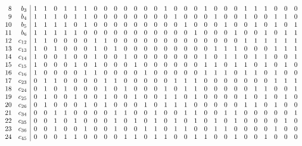 \documentclass{article}
\begin{document}
{{$$\begin{array}{rr|*{27}r}
8 & b_{3} & 1 & 1 & 0 & 1 & 1 & 1 & 0 & 0 & 0 & 0 & 0 & 0 & 0 & 1 & 0 & 0 & 0 & 1 & 0 & 0 & 0 & 1 & 1 & 1 & 0 & 0 & 0\\
9 & b_{4} & 1 & 1 & 1 & 0 & 1 & 1 & 0 & 0 & 0 & 0 & 0 & 0 & 0 & 0 & 1 & 0 & 0 & 0 & 1 & 0 & 0 & 1 & 0 & 0 & 1 & 1 & 0\\
10 & b_{5} & 1 & 1 & 1 & 1 & 0 & 1 & 0 & 0 & 0 & 0 & 0 & 0 & 0 & 0 & 0 & 1 & 0 & 0 & 0 & 1 & 0 & 0 & 1 & 0 & 1 & 0 & 1\\
11 & b_{6} & 1 & 1 & 1 & 1 & 1 & 0 & 0 & 0 & 0 & 0 & 0 & 0 & 0 & 0 & 0 & 0 & 1 & 0 & 0 & 0 & 1 & 0 & 0 & 1 & 0 & 1 & 1\\
12 & c_{12} & 1 & 1 & 0 & 0 & 0 & 0 & 1 & 1 & 0 & 0 & 0 & 0 & 0 & 0 & 0 & 0 & 0 & 0 & 0 & 0 & 0 & 1 & 1 & 1 & 1 & 1 & 1\\
13 & c_{13} & 1 & 0 & 1 & 0 & 0 & 0 & 1 & 0 & 1 & 0 & 0 & 0 & 0 & 0 & 0 & 0 & 0 & 0 & 1 & 1 & 1 & 0 & 0 & 0 & 1 & 1 & 1\\
14 & c_{14} & 1 & 0 & 0 & 1 & 0 & 0 & 1 & 0 & 0 & 1 & 0 & 0 & 0 & 0 & 0 & 0 & 0 & 1 & 0 & 1 & 1 & 0 & 1 & 1 & 0 & 0 & 1\\
15 & c_{15} & 1 & 0 & 0 & 0 & 1 & 0 & 1 & 0 & 0 & 0 & 1 & 0 & 0 & 0 & 0 & 0 & 0 & 1 & 1 & 0 & 1 & 1 & 0 & 1 & 0 & 1 & 0\\
16 & c_{16} & 1 & 0 & 0 & 0 & 0 & 1 & 1 & 0 & 0 & 0 & 0 & 1 & 0 & 0 & 0 & 0 & 0 & 1 & 1 & 1 & 0 & 1 & 1 & 0 & 1 & 0 & 0\\
17 & c_{23} & 0 & 1 & 1 & 0 & 0 & 0 & 0 & 1 & 1 & 0 & 0 & 0 & 0 & 0 & 1 & 1 & 1 & 0 & 0 & 0 & 0 & 0 & 0 & 0 & 1 & 1 & 1\\
18 & c_{24} & 0 & 1 & 0 & 1 & 0 & 0 & 0 & 1 & 0 & 1 & 0 & 0 & 0 & 1 & 0 & 1 & 1 & 0 & 0 & 0 & 0 & 0 & 1 & 1 & 0 & 0 & 1\\
19 & c_{25} & 0 & 1 & 0 & 0 & 1 & 0 & 0 & 1 & 0 & 0 & 1 & 0 & 0 & 1 & 1 & 0 & 1 & 0 & 0 & 0 & 0 & 1 & 0 & 1 & 0 & 1 & 0\\
20 & c_{26} & 0 & 1 & 0 & 0 & 0 & 1 & 0 & 1 & 0 & 0 & 0 & 1 & 0 & 1 & 1 & 1 & 0 & 0 & 0 & 0 & 0 & 1 & 1 & 0 & 1 & 0 & 0\\
21 & c_{34} & 0 & 0 & 1 & 1 & 0 & 0 & 0 & 0 & 1 & 1 & 0 & 0 & 1 & 0 & 0 & 1 & 1 & 0 & 0 & 1 & 1 & 0 & 0 & 0 & 0 & 0 & 1\\
22 & c_{35} & 0 & 0 & 1 & 0 & 1 & 0 & 0 & 0 & 1 & 0 & 1 & 0 & 1 & 0 & 1 & 0 & 1 & 0 & 1 & 0 & 1 & 0 & 0 & 0 & 0 & 1 & 0\\
23 & c_{36} & 0 & 0 & 1 & 0 & 0 & 1 & 0 & 0 & 1 & 0 & 0 & 1 & 1 & 0 & 1 & 1 & 0 & 0 & 1 & 1 & 0 & 0 & 0 & 0 & 1 & 0 & 0\\
24 & c_{45} & 0 & 0 & 0 & 1 & 1 & 0 & 0 & 0 & 0 & 1 & 1 & 0 & 1 & 1 & 0 & 0 & 1 & 1 & 0 & 0 & 1 & 0 & 0 & 1 & 0 & 0 & 0\\

\end{array}$$}}
\end{document}

